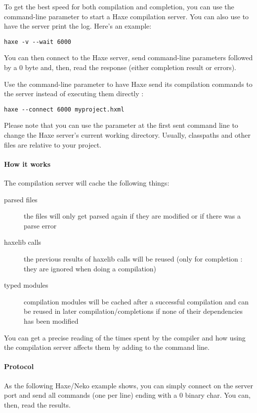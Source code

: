 To get the best speed for both compilation and completion, you can use the  command-line parameter to start a Haxe compilation server. You can also use  to have the server print the log. Here's an example:

\begin{lstlisting}
haxe -v --wait 6000
\end{lstlisting}

You can then connect to the Haxe server, send command-line parameters followed by a 0 byte and, then, read the response (either completion result or errors).

Use the  command-line parameter to have Haxe send its compilation commands to the server instead of executing them directly :

\begin{lstlisting}
haxe --connect 6000 myproject.hxml
\end{lstlisting}

Please note that you can use the parameter  at the first sent command line to change the Haxe server's current working directory. Usually, classpaths and other files are relative to your project.

\paragraph{How it works}
The compilation server will cache the following things:

\begin{description}
    \item[parsed files] the files will only get parsed again if they are modified or if there was a parse error
    \item[haxelib calls] the previous results of haxelib calls will be reused (only for completion : they are ignored when doing a compilation)
    \item[typed modules] compilation modules will be cached after a successful compilation and can be reused in later compilation/completions if none of their dependencies has been modified
\end{description}

You can get a precise reading of the times spent by the compiler and how using the compilation server affects them by adding  to the command line.

\paragraph{Protocol}
As the following Haxe/Neko example shows, you can simply connect on the server port and send all commands (one per line) ending with a 0 binary char. You can, then, read the results.

